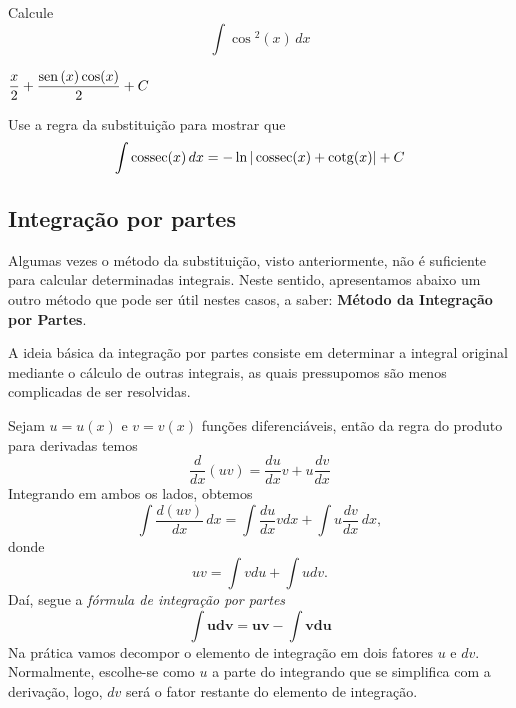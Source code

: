\cleardoublepage\documentclass[../main.tex]{subfiles}
\begin{document}
\begin{exer}
  Calcule
  \begin{equation*}
    \int \cos\!\!^2(x)\,dx
  \end{equation*}
\end{exer}
\begin{resp}
  $\displaystyle \frac{x}{2} + \frac{\operatorname{sen}\,(x)\cos(x)}{2} + C$
\end{resp}

\begin{exer}\label{exer:int_subs_cossec}
  Use a regra da substituição para mostrar que
  \begin{equation*}
    \int \operatorname{cossec}(x)\,dx = -\ln|\operatorname{cossec}(x)+\operatorname{cotg}(x)| + C
  \end{equation*}
\end{exer}


\subsection{Integração por partes}\hypertarget{IntPartes}{}\label{cap_int_sec_partes}
Algumas vezes o método da substituição, visto anteriormente, não é suficiente para calcular determinadas integrais. Neste sentido, apresentamos abaixo um outro método que pode ser útil nestes casos, a saber: \textbf{Método da Integração por Partes}. 

A ideia básica da integração por partes consiste em determinar a integral original mediante o cálculo de outras integrais, as quais pressupomos são menos complicadas de ser resolvidas.

Sejam $u=u(x)$ e $v=v(x)$ funções diferenciáveis, então da regra do produto para derivadas temos
\begin{equation*}
  \frac{d}{dx}(uv) = \frac{du}{dx}v + u\frac{dv}{dx}
\end{equation*}
Integrando em ambos os lados, obtemos
\begin{equation*}
  \int \frac{d (uv)}{dx}\,dx = \int \frac{du}{dx}vdx + \int u\frac{dv}{dx}\,dx,
\end{equation*}
donde
\begin{equation*}
  uv = \int vdu + \int udv.
\end{equation*}
Daí, segue a \emph{fórmula de integração por partes}
\begin{equation}
  \boldsymbol{\int udv = uv - \int vdu}\label{eq:IntPartes}
\end{equation}Na prática vamos decompor o elemento de integração em dois fatores \(u\) e \(dv\). Normalmente, escolhe-se como \(u\) a parte do integrando que se simplifica com a derivação, logo, \(dv\) será o fator restante do elemento de integração.
\end{document}
